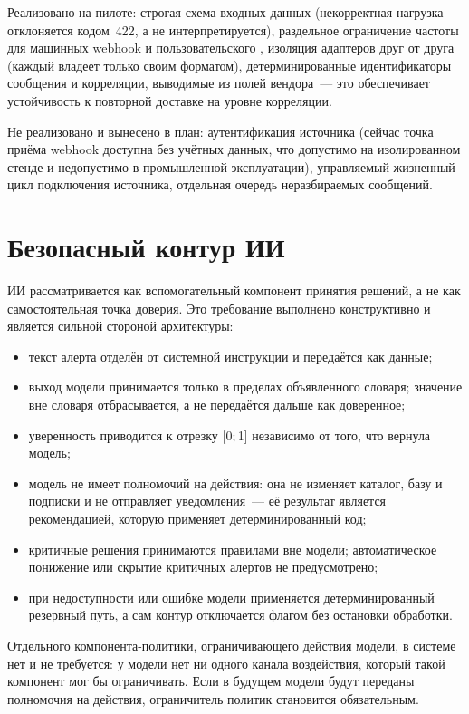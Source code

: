 \documentclass[utf8x, 12pt]{G7-32} %
\begin{document}
Реализовано на пилоте: строгая схема входных данных (некорректная нагрузка
отклоняется кодом~422, а не интерпретируется), раздельное ограничение частоты
для машинных webhook и пользовательского , изоляция адаптеров друг от друга
(каждый владеет только своим форматом), детерминированные идентификаторы
сообщения и корреляции, выводимые из полей вендора~--- это обеспечивает
устойчивость к повторной доставке на уровне корреляции.

Не реализовано и вынесено в план: аутентификация источника (сейчас точка приёма
webhook доступна без учётных данных, что допустимо на изолированном стенде и
недопустимо в промышленной эксплуатации), управляемый жизненный цикл
подключения источника, отдельная очередь неразбираемых сообщений.

\section{Безопасный контур ИИ}
ИИ рассматривается как вспомогательный компонент принятия решений, а не как
самостоятельная точка доверия. Это требование выполнено конструктивно и
является сильной стороной архитектуры:

\begin{itemize}
    \item текст алерта отделён от системной инструкции и передаётся как данные;
    \item выход модели принимается только в пределах объявленного словаря;
          значение вне словаря отбрасывается, а не передаётся дальше как
          доверенное;
    \item уверенность приводится к отрезку [0;\,1] независимо от того, что
          вернула модель;
    \item модель не имеет полномочий на действия: она не изменяет каталог, базу
          и подписки и не отправляет уведомления~--- её результат является
          рекомендацией, которую применяет детерминированный код;
    \item критичные решения принимаются правилами вне модели; автоматическое
          понижение или скрытие критичных алертов не предусмотрено;
    \item при недоступности или ошибке модели применяется детерминированный
          резервный путь, а сам контур отключается флагом без остановки
          обработки.
\end{itemize}

Отдельного компонента-политики, ограничивающего действия модели, в системе нет
и не требуется: у модели нет ни одного канала воздействия, который такой
компонент мог бы ограничивать. Если в будущем модели будут переданы полномочия
на действия, ограничитель политик становится обязательным.
\end{document}
